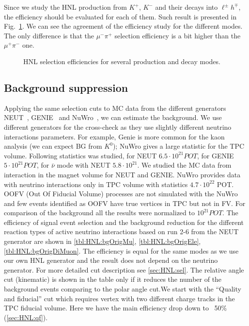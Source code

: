 \documentclass[../main.tex]{subfiles}
\begin{document}
Since we study the HNL production from $K^+$,  $K^-$ and their decays into $\ell^{\pm}h^{\mp}$, the efficiency should be evaluated for each of them. Such result is presented in Fig.~\ref{fig:HNL:C_check}. We can see the agreement of the efficiency study for the different modes. The only difference is that the $\mu^-\pi^+$ selection efficiency is a bit higher than the $\mu^+\pi^-$ one.
\begin{figure}[!ht]
  \begin{minipage}{0.49\linewidth}
  \end{minipage}
  \hfill
  \begin{minipage}{0.49\linewidth}
  \end{minipage}
  \caption{HNL selection efficiencies for several production and decay modes.}
  \label{fig:HNL:C_check}
\end{figure}

\subsection{Background suppression}
\label{sec:HNL:bg}
Applying the same selection cuts to MC data from the different generators NEUT~\cite{Hayato2002}, GENIE~\cite{Andreopoulos2010} and NuWro~\cite{Zmuda2015}, we can estimate the background. We use different generators for the cross-check as they use slightly different neutrino interactions parameters. For example, Genie is more common for the kaon analysis (we can expect BG from $K^0$); NuWro gives a large statistic for the TPC volume. Following statistics was studied, for NEUT $6.5\cdot 10^{21} POT$, for GENIE $5\cdot 10^{21}POT$, for $\bar{\nu}$ mode with NEUT $5.8\cdot 10^{21}$. We studied the MC data from interaction in the magnet volume for NEUT and GENIE. NuWro provides data with neutrino interactions only in TPC volume with statistics $4.7\cdot10^{22}$ POT. OOFV (Out Of Fiducial Volume) processes are not simulated with the NuWro and few events identified as OOFV have true vertices in TPC but not in FV. For comparison of the background all the results were normalized to $10^{21}POT$. The efficiency of signal event selection and the background reduction for the different reaction types of active neutrino interactions based on run 2-6 from the NEUT generator are shown in \autoref{tbl:HNL:bgOrigMu}, \autoref{tbl:HNL:bgOrigEle}, \autoref{tbl:HNL:bgOrigDiMuon}. The efficiency is equal for the same modes as we use our own HNL generator and the result does not depend on the neutrino generator. For more detailed cut description see \autoref{sec:HNL:sel}. The relative angle cut (kinematic) is shown in the table only if it reduces the number of the background events comparing to the polar angle cut.We start with the ``Quality and fiducial'' cut which requires  vertex with two different charge tracks in the TPC fiducial volume. Here we have the main efficiency drop down to ~50\% (\autoref{sec:HNL:qf}).
\end{document}
